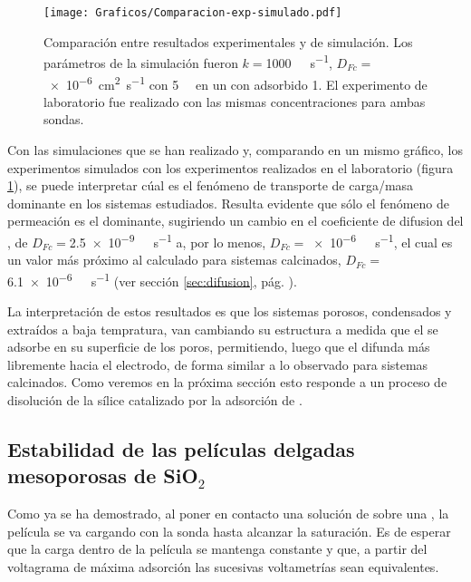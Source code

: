 		
				\begin{figure}[ht]
					\centering
			 	    \texttt{[image: Graficos/Comparacion-exp-simulado.pdf]}
			        \caption[Simulación EQ comparadas con datos experimentales]{Comparación entre resultados experimentales y de simulación. Los parámetros de la simulación fueron $k=$\SI{1000}{\per\Molar\per\second}, $D_{Fc}=$ \SI{e-6}{\square\cm\per\second} con \fc\space \SI{5}{\milli\Molar} en un \pdm\space con \ru\space adsorbido \SI{1}{\Molar}. El experimento de laboratorio fue realizado con las mismas concentraciones para ambas sondas.}
			        \label{fig:comp_sim_exp}
			      	\end{figure}
		
	    \pagebreak

		Con las simulaciones que se han realizado y, comparando en un mismo gráfico, los experimentos simulados con los experimentos realizados en el laboratorio (figura \ref{fig:comp_sim_exp}), se puede interpretar cúal es el fenómeno de transporte de carga/masa dominante en los sistemas estudiados. Resulta evidente que sólo el fenómeno de permeación es el dominante, sugiriendo un cambio en el coeficiente de difusion del \fc, de $D_{Fc}=$\SI{2.5e-9}{\per\Molar\per\second} a, por lo menos, $D_{Fc}\!=$\SI{e-6}{\per\Molar\per\second}, el cual es un valor más próximo al calculado para sistemas calcinados, $D_{Fc}=$\SI{6.1e-6}{\per\Molar\per\second} (ver sección \ref{sec:difusion}, pág. \pageref{sec:difusion}). 

		La interpretación de estos resultados es que los sistemas porosos, condensados y extraídos a baja tempratura, van cambiando su estructura a medida que el \ru\space se adsorbe en su superficie de los poros, permitiendo, luego que el \fc\space difunda más libremente hacia el electrodo, de forma similar a lo observado para sistemas calcinados. Como veremos en la próxima sección esto responde a un proceso de disolución de la sílice catalizado por la adsorción de \aminorutenio.

	\subsection{Estabilidad de las películas delgadas mesoporosas de \texorpdfstring{SiO$_2$}{SiO2}}

		Como ya se ha demostrado, al poner en contacto una solución de \ru\space sobre una \pdmF, la película se va cargando con la sonda hasta alcanzar la saturación. Es de esperar que la carga dentro de la película se mantenga constante y que, a partir del voltagrama de máxima adsorción las sucesivas voltametrías sean equivalentes.


